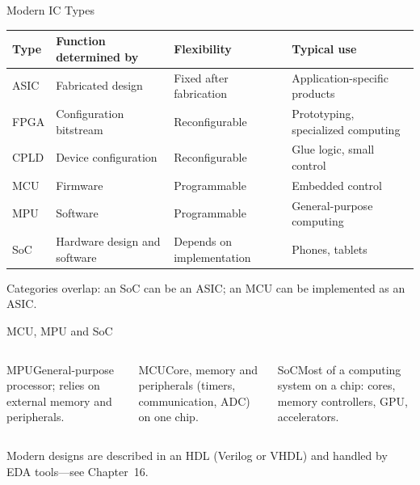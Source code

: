 \documentclass[9pt,aspectratio=169,xcolor=table]{beamer}
\newcommand{\striped}{\rowcolors{1}{white}{stripe}}
\begin{document}
\begin{frame}{Modern IC Types}
  \begin{table}
  \centering\footnotesize\striped
  \begin{tabular}{@{}lR{.27\textwidth}R{.2\textwidth}R{.25\textwidth}@{}}
    \toprule
    \textbf{Type} & \textbf{Function determined by} & \textbf{Flexibility} & \textbf{Typical use} \\
    \midrule
    ASIC & Fabricated design & Fixed after fabrication & Application-specific products \\
    FPGA & Configuration bitstream & Reconfigurable & Prototyping, specialized computing \\
    CPLD & Device configuration & Reconfigurable & Glue logic, small control \\
    MCU  & Firmware & Programmable & Embedded control \\
    MPU  & Software & Programmable & General-purpose computing \\
    SoC  & Hardware design and software & Depends on implementation & Phones, tablets \\
    \bottomrule
  \end{tabular}
  \end{table}
  Categories overlap: an SoC can be an ASIC; an MCU can be implemented as an ASIC.
\end{frame}

\begin{frame}{MCU, MPU and SoC}
  \begin{columns}[t]
  \begin{column}{.33\textwidth}
    \begin{block}{MPU}\small General-purpose processor; relies on external memory and peripherals.\end{block}
  \end{column}
  \begin{column}{.33\textwidth}
    \begin{block}{MCU}\small Core, memory and peripherals (timers, communication, ADC) on one chip.\end{block}
  \end{column}
  \begin{column}{.33\textwidth}
    \begin{block}{SoC}\small Most of a computing system on a chip: cores, memory controllers, GPU, accelerators.\end{block}
  \end{column}
  \end{columns}
  \vspace{3mm}
  Modern designs are described in an HDL (Verilog or VHDL) and handled by EDA tools---see Chapter~16.
\end{frame}
\end{document}

